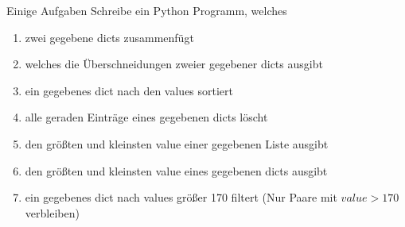 \begin{frame}{Einige Aufgaben}
Schreibe ein Python Programm, welches
	\begin{enumerate}
		\item zwei gegebene dicts zusammenfügt
		\item welches die Überschneidungen zweier gegebener dicts ausgibt
		\item ein gegebenes dict nach den values sortiert
		\item alle geraden Einträge eines gegebenen dicts löscht
		\item den größten und kleinsten value einer gegebenen Liste ausgibt
		\item den größten und kleinsten value eines gegebenen dicts ausgibt
		\item ein gegebenes dict nach values größer 170 filtert (Nur Paare mit $value>170$ verbleiben)
	\end{enumerate}
\end{frame}



